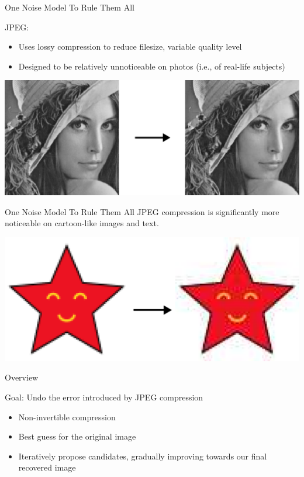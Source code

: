 \documentclass[10pt]{beamer}
\begin{document}
\begin{frame}{One Noise Model To Rule Them All}
\begin{block}{JPEG:}
\begin{itemize}
\item Uses lossy compression to reduce filesize, variable quality level
\item Designed to be relatively unnoticeable on photos (i.e., of real-life subjects)
\end{itemize}
\begin{center}
\includegraphics[scale=0.4]{img/yields-lena}
\end{center}
\end{block}
\end{frame}

\begin{frame}{One Noise Model To Rule Them All}
JPEG compression is significantly more noticeable on cartoon-like images and text.
\begin{center}
\includegraphics[scale=0.4]{img/yields-jpeg}
\end{center}
\end{frame}

\begin{frame}{Overview}
\begin{block}{Goal: Undo the error introduced by JPEG compression}
\begin{itemize}
\item Non-invertible compression
\item Best guess for the original image
\item Iteratively propose candidates, gradually improving towards our final recovered image
\end{itemize}
\end{block}
\end{frame}
\end{document}
